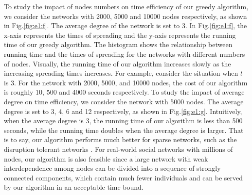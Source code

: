 To study the impact of nodes numbers on time efficiency of our greedy algorithm, we consider the networks with 2000, 5000 and 10000 nodes respectively, as shown in Fig.\ref{fig:e1:f}. The average degree of the network is set to 3. In Fig.\ref{fig:e1:f}, the x-axis represents the times of spreading and the y-axis represents the running time of our greedy algorithm. The histogram shows the relationship between running time and the times of spreading for the networks with different numbers of nodes. Visually, the running time of our algorithm increases slowly as the increasing spreading times increases. For example, consider the situation when $t$ is 3. For the network with 2000, 5000, and 10000 nodes, the cost of our algorithm is roughly 10, 500 and 4000 seconds respectively. To study the impact of average degree on time efficiency, we consider the network with 5000 nodes. The average degree is set to 3, 4, 6 and 12 respectively, as shown in Fig.\ref{fig:e1:g}. Intuitively, when the average degree is 3, the running time of our algorithm is less than 500 seconds, while the running time doubles when the average degree is larger. That is to say, our algorithm performs much better for sparse networks,  such as the disruption tolerant networks \cite{ShiNew/ZWLDC2014}.
For real-world social networks with millions of nodes, our algorithm is also feasible since a large network with weak interdependence among nodes can be divided into a sequence of strongly connected components, which contain much fewer individuals and can be served by our algorithm in an acceptable time bound.
